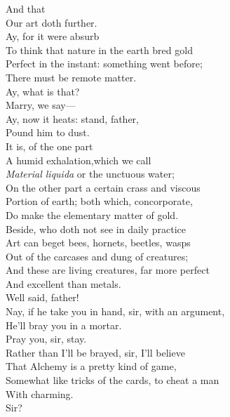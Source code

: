 \documentclass[a4paper,oneside,12pt]{memoir}
\begin{document}
\begin{drama*}
\mammonspeaks {} And that\\
Our art doth further.\\
\subtlespeaks {} Ay, for it were absurb\\
To think that nature in the earth bred gold\\
Perfect in the instant: something went before;\\
There must be remote matter.\\
\surlyspeaks {} Ay, what is that?\\
\subtlespeaks Marry, we say---\\
\mammonspeaks {} Ay, now it heats: stand, father,\\
Pound him to dust.\\
\subtlespeaks {} It is, of the one part\\
A humid exhalation,which we call\\
\emph{Material liquida} or the unctuous water;\\
On the other part a certain crass and viscous\\
Portion of earth; both which, concorporate,\\
Do make the elementary matter of gold.\\
Beside, who doth not see in daily practice\\
Art can beget bees, hornets, beetles, wasps\\
Out of the carcases and dung of creatures;\\
And these are living creatures, far more perfect\\
And excellent than metals.\\
\mammonspeaks {} Well said, father!\\
Nay, if he take you in hand, sir, with an argument,\\
He'll bray you in a mortar.\\
\surlyspeaks {} Pray you, sir, stay.\\
Rather than I'll be brayed, sir, I'll believe\\
That Alchemy is a pretty kind of game,\\
Somewhat like tricks of the cards, to cheat a man\\
With charming.\\
\subtlespeaks {} Sir?\\

\end{drama*}
\end{document}
